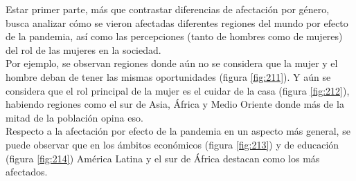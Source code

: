 \documentclass[12pt]{article}
\begin{document}
Estar primer parte, más que contrastar diferencias de afectación por género, busca analizar cómo se vieron afectadas diferentes regiones del mundo por efecto de la pandemia, así como las percepciones (tanto de hombres como de mujeres) del rol de  las mujeres en la sociedad.\\
Por ejemplo, se observan regiones donde aún no se considera que la mujer y el hombre deban de tener las mismas oportunidades (figura \ref{fig:211}). Y aún se considera que el rol principal de la mujer es el cuidar de la casa (figura \ref{fig:212}), habiendo regiones como el sur de Asia, África y Medio Oriente donde más de la mitad de la población opina eso.\\
Respecto a la afectación por efecto de la pandemia en un aspecto más general, se puede observar que en los ámbitos económicos (figura \ref{fig:213}) y de educación (figura \ref{fig:214}) América Latina y el sur de África destacan como los más afectados.
\end{document}
